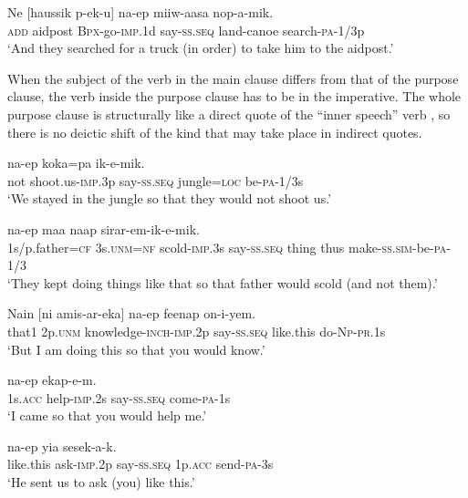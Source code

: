 \ea%
\label{ex:x1620}
\gll Ne  [haussik  p-ek-u] na-ep miiw-aasa nop-a-mik.\\
\textsc{add} aidpost \textsc{Bpx}-go-\textsc{imp}.1d say-\textsc{ss}.\textsc{seq} land-canoe search-\textsc{pa}-1/3p\\
\glt`And they searched for a truck (in order) to take him to the aidpost.'
\z


When the subject of the verb in the main clause differs from that of the purpose clause, the verb inside the purpose clause has to be in the imperative. The whole purpose clause is structurally like a direct quote of the ``inner speech'' verb , so there is no deictic shift of the kind that may take place in indirect quotes.  

\ea%
\label{ex:x1062}
\gll [Me  yiar-uk]  na-ep  koka=pa  ik-e-mik. \\
not  shoot.us-\textsc{imp}.3p say-\textsc{ss}.\textsc{seq} jungle=\textsc{loc} be-\textsc{pa}-1/3s\\
\glt`We stayed in the jungle so that they would not shoot us.'
\z


\ea%
\label{ex:x346}
\gll [Auwa=ke  o=ko  amukar-inok]  na-ep  maa  naap sirar-em-ik-e-mik.\\
1s/p.father=\textsc{cf} 3s.\textsc{unm}=\textsc{nf} scold-\textsc{imp}.3s say-\textsc{ss}.\textsc{seq} thing thus make-\textsc{ss}.\textsc{sim}-be-\textsc{pa}-1/3\\
\glt`They kept doing things like that so that father would scold  (and not them).'
\z


\ea%
\label{ex:x1615}
\gll Nain  [ni  amis-ar-eka]  na-ep  feenap on-i-yem.\\
that1 2p.\textsc{unm} knowledge-\textsc{inch}-\textsc{imp}.2p  say-\textsc{ss}.\textsc{seq} like.this do-\textsc{Np}-\textsc{pr}.1s\\
\glt`But I am doing this so that you would know.'
\z


\ea%
\label{ex:x1617}
  na-ep  ekap-e-m. \\
1s.\textsc{acc} help-\textsc{imp}.2s say-\textsc{ss}.\textsc{seq} come-\textsc{pa}-1s\\
\glt`I came so that you would help me.'
\z


\ea%
\label{ex:x1618}
  na-ep  yia  sesek-a-k. \\
like.this  ask-\textsc{imp}.2p say-\textsc{ss}.\textsc{seq} 1p.\textsc{acc} send-\textsc{pa}-3s\\
\glt`He sent us to ask (you) like this.'
\z


